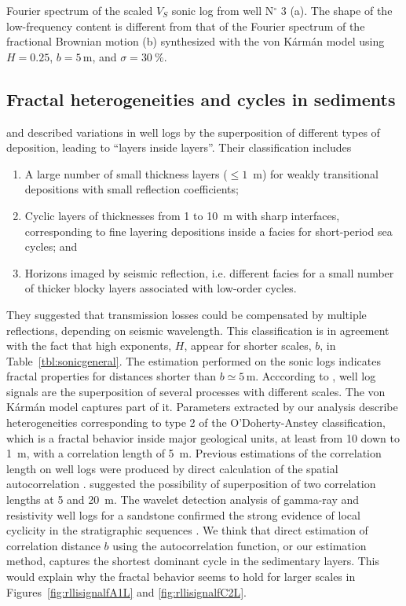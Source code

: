 {Fourier spectrum of the scaled $V_S$ sonic log from well N$^{\circ}$ 3 (a). The shape of the low-frequency 
content is different from that of the Fourier spectrum of the fractional Brownian motion (b)
synthesized with the von K\'arm\'an model using $H=0.25$, $b=5$\,m, and $\sigma=30~\%$.}

\subsection{Fractal heterogeneities and cycles in sediments}

\cite{Odoherty_A71} and \cite{Anstey_D02a} described variations in
well logs by the superposition of different types of deposition,
leading to ``layers inside layers''.  Their classification includes
\begin{enumerate}
\renewcommand{\theenumi}{\arabic{enumi}}
\item A large number of small thickness layers ($\leq 1$~m)
for weakly transitional depositions with small reflection coefficients;
\item Cyclic layers of thicknesses from 1 to 10~m with sharp interfaces,
corresponding to fine layering depositions inside a facies
for short-period sea cycles; and
\item Horizons imaged by seismic reflection, i.e. different facies for a small number of thicker blocky layers associated with low-order cycles.
\end{enumerate}
They suggested that transmission losses could be compensated by
multiple reflections, depending on seismic wavelength.  This
classification is in agreement with the fact that high exponents, $H$,
appear for shorter scales, $b$, in Table~\ref{tbl:sonicgeneral}.  The
estimation performed on the sonic logs indicates fractal properties
for distances shorter than $b\simeq 5$\,m.  Acccording to
\cite{Anstey_D02a}, well log signals are the superposition of several
processes with different scales.  The von K\'arm\'an model captures
part of it.  Parameters extracted by our analysis describe
heterogeneities corresponding to type 2 of the O'Doherty-Anstey
classification, which is a fractal behavior inside major geological
units, at least from 10 down to 1~m, with a correlation length of 5~m.
Previous estimations of the correlation length on well logs were
produced by direct calculation of the spatial autocorrelation
\cite[]{White_SN90,Shiomi_SO97}.  \cite{White_SN90} suggested the
possibility of superposition of two correlation lengths at 5 and 20~m.
The wavelet detection analysis of gamma-ray and resistivity well logs
for a sandstone confirmed the strong evidence of local cyclicity in
the stratigraphic sequences \cite[]{Rivera_RJCA04}.  We think that
direct estimation of correlation distance $b$ using the
autocorrelation function, or our estimation method, captures the
shortest dominant cycle in the sedimentary layers.  This would explain
why the fractal behavior seems to hold for larger scales in
Figures~\ref{fig:rllisignalfA1L} and \ref{fig:rllisignalfC2L}.

